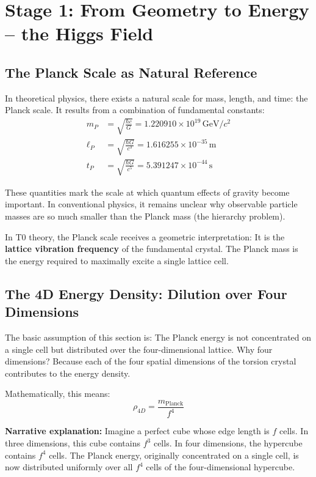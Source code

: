 	\section{Stage 1: From Geometry to Energy -- the Higgs Field}
	
	\subsection{The Planck Scale as Natural Reference}
	
	In theoretical physics, there exists a natural scale for mass, length, and time: the Planck scale. It results from a combination of fundamental constants:
	\begin{align}
		m_P &= \sqrt{\frac{\hbar c}{G}} = 1.220910 \times 10^{19}\,\text{GeV}/c^2 \\
		\ell_P &= \sqrt{\frac{\hbar G}{c^3}} = 1.616255 \times 10^{-35}\,\text{m} \\
		t_P &= \sqrt{\frac{\hbar G}{c^5}} = 5.391247 \times 10^{-44}\,\text{s}
	\end{align}
	
	These quantities mark the scale at which quantum effects of gravity become important. In conventional physics, it remains unclear why observable particle masses are so much smaller than the Planck mass (the hierarchy problem).
	
	In T0 theory, the Planck scale receives a geometric interpretation: It is the \textbf{lattice vibration frequency} of the fundamental crystal. The Planck mass is the energy required to maximally excite a single lattice cell.
	
	\subsection{The 4D Energy Density: Dilution over Four Dimensions}
	
	The basic assumption of this section is: The Planck energy is not concentrated on a single cell but distributed over the four-dimensional lattice. Why four dimensions? Because each of the four spatial dimensions of the torsion crystal contributes to the energy density.
	
	Mathematically, this means:
	\begin{equation}
		\boxed{\rho_{4D} = \frac{m_{\text{Planck}}}{f^4}}
	\end{equation}
	
	\textbf{Narrative explanation:} Imagine a perfect cube whose edge length is \(f\) cells. In three dimensions, this cube contains \(f^3\) cells. In four dimensions, the hypercube contains \(f^4\) cells. The Planck energy, originally concentrated on a single cell, is now distributed uniformly over all \(f^4\) cells of the four-dimensional hypercube.
	
